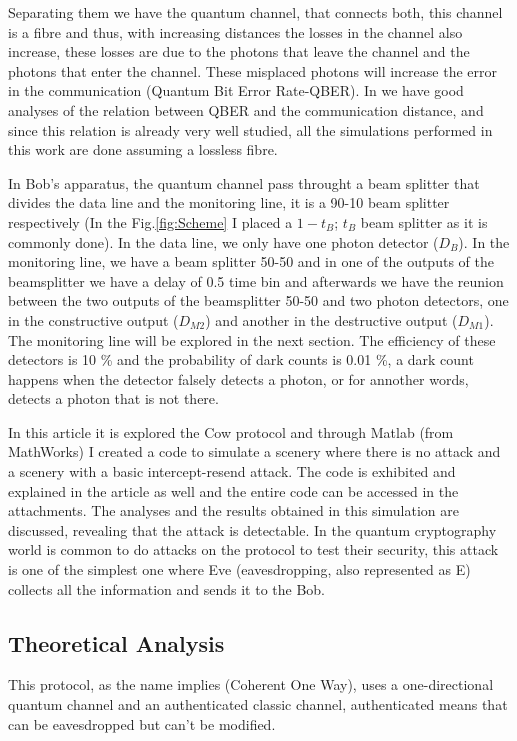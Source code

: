 \begin{refsection}
Separating them we have the quantum channel, that connects both, this channel is a fibre and thus, with increasing distances the losses in the channel also increase, these losses are due to the photons that leave the channel and the photons that enter the channel. These misplaced photons will increase the error in the communication (Quantum Bit Error Rate-QBER). In \cite{kronberg2017analysis} we have good analyses of the relation between QBER and the communication distance, and since this relation is already very well studied, all the simulations performed in this work are done assuming a lossless fibre.

In Bob's apparatus, the quantum channel pass throught a beam splitter that divides the data line and the monitoring line, it is a 90-10 beam splitter respectively (In the Fig.\ref{fig:Scheme} I placed a $1-t_B$; $t_B$ beam splitter as it is commonly done). In the data line, we only have one photon detector ($D_B$). In the monitoring line, we have a beam splitter 50-50 and in one of the outputs of the beamsplitter we have a delay of 0.5 time bin and afterwards we have the reunion between the two outputs of the beamsplitter 50-50 and two photon detectors, one in the constructive output ($D_{M2}$) and another in the destructive output ($D_{M1}$). The monitoring line will be explored in the next section. The efficiency of these detectors is 10 \% and the probability of dark counts is 0.01 \%, a dark count happens when the detector falsely detects a photon, or for annother words, detects a photon that is not there.

In this article it is explored the Cow protocol and through Matlab (from MathWorks) I created a code to simulate a scenery where there is no attack and a scenery with a basic intercept-resend attack. The code is exhibited and explained in the article as well and the entire code can be accessed in the attachments. The analyses and the results obtained in this simulation are discussed, revealing that the attack is detectable.  In the quantum cryptography world is common to do attacks on the protocol to test their security, this attack is one of the simplest one where Eve (eavesdropping, also represented as E) collects all the information and sends it to the Bob.

\subsection{Theoretical Analysis}

This protocol, as the name implies (Coherent One Way), uses a one-directional quantum channel and an authenticated classic channel, authenticated means that can be eavesdropped but can't be modified.


\end{refsection}
